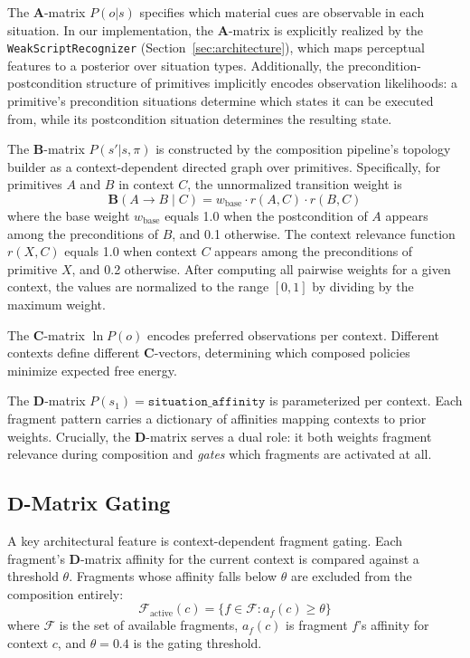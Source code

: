 \documentclass[11pt,a4paper]{article}
\newcommand{\A}{\mathbf{A}}
\newcommand{\B}{\mathbf{B}}
\newcommand{\CC}{\mathbf{C}}
\newcommand{\D}{\mathbf{D}}
\begin{document}
The $\A$-matrix $P(o | s)$ specifies which material cues are observable in each situation.  In our implementation, the $\A$-matrix is explicitly realized by the \texttt{WeakScriptRecognizer} (Section~\ref{sec:architecture}), which maps perceptual features to a posterior over situation types.  Additionally, the precondition-postcondition structure of primitives implicitly encodes observation likelihoods: a primitive's precondition situations determine which states it can be executed from, while its postcondition situation determines the resulting state.

The $\B$-matrix $P(s' | s, \pi)$ is constructed by the composition pipeline's topology builder as a context-dependent directed graph over primitives.  Specifically, for primitives $A$ and $B$ in context $C$, the unnormalized transition weight is
\begin{equation}
  \B(A \to B \mid C) = w_{\text{base}} \cdot r(A, C) \cdot r(B, C)
  \label{eq:b-matrix}
\end{equation}
where the base weight $w_{\text{base}}$ equals 1.0 when the postcondition of $A$ appears among the preconditions of $B$, and 0.1 otherwise.  The context relevance function $r(X, C)$ equals 1.0 when context $C$ appears among the preconditions of primitive $X$, and 0.2 otherwise.  After computing all pairwise weights for a given context, the values are normalized to the range $[0, 1]$ by dividing by the maximum weight.

The $\CC$-matrix $\ln P(o)$ encodes preferred observations per context.  Different contexts define different $\CC$-vectors, determining which composed policies minimize expected free energy.

The $\D$-matrix $P(s_1) = \texttt{situation\_affinity}$ is parameterized per context.  Each fragment pattern carries a dictionary of affinities mapping contexts to prior weights.  Crucially, the $\D$-matrix serves a dual role: it both weights fragment relevance during composition and \emph{gates} which fragments are activated at all.

\subsection{$\D$-Matrix Gating}

A key architectural feature is context-dependent fragment gating.  Each fragment's $\D$-matrix affinity for the current context is compared against a threshold $\theta$.  Fragments whose affinity falls below $\theta$ are excluded from the composition entirely:
\begin{equation}
  \mathcal{F}_{\text{active}}(c) = \{ f \in \mathcal{F} : a_f(c) \geq \theta \}
  \label{eq:d-gating}
\end{equation}
where $\mathcal{F}$ is the set of available fragments, $a_f(c)$ is fragment $f$'s affinity for context $c$, and $\theta = 0.4$ is the gating threshold.
\end{document}
